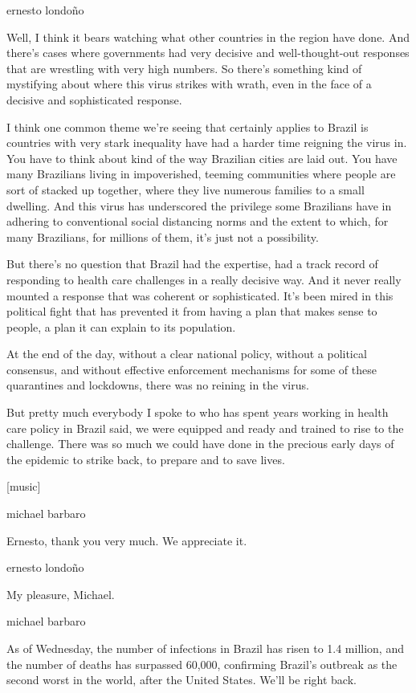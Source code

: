ernesto londoño

Well, I think it bears watching what other countries in the region have
done. And there's cases where governments had very decisive and
well-thought-out responses that are wrestling with very high numbers. So
there's something kind of mystifying about where this virus strikes with
wrath, even in the face of a decisive and sophisticated response.

I think one common theme we're seeing that certainly applies to Brazil
is countries with very stark inequality have had a harder time reigning
the virus in. You have to think about kind of the way Brazilian cities
are laid out. You have many Brazilians living in impoverished, teeming
communities where people are sort of stacked up together, where they
live numerous families to a small dwelling. And this virus has
underscored the privilege some Brazilians have in adhering to
conventional social distancing norms and the extent to which, for many
Brazilians, for millions of them, it's just not a possibility.

But there's no question that Brazil had the expertise, had a track
record of responding to health care challenges in a really decisive way.
And it never really mounted a response that was coherent or
sophisticated. It's been mired in this political fight that has
prevented it from having a plan that makes sense to people, a plan it
can explain to its population.

At the end of the day, without a clear national policy, without a
political consensus, and without effective enforcement mechanisms for
some of these quarantines and lockdowns, there was no reining in the
virus.

But pretty much everybody I spoke to who has spent years working in
health care policy in Brazil said, we were equipped and ready and
trained to rise to the challenge. There was so much we could have done
in the precious early days of the epidemic to strike back, to prepare
and to save lives.

{[}music{]}

michael barbaro

Ernesto, thank you very much. We appreciate it.

ernesto londoño

My pleasure, Michael.

michael barbaro

As of Wednesday, the number of infections in Brazil has risen to 1.4
million, and the number of deaths has surpassed 60,000, confirming
Brazil's outbreak as the second worst in the world, after the United
States. We'll be right back.

